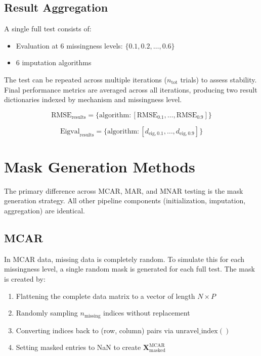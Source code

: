 \documentclass[preprint]{aastex631}
\begin{document}
\subsection{Result Aggregation}

A single full test consists of:
\begin{itemize}
  \item Evaluation at 6 missingness levels: $\{0.1, 0.2, \ldots, 0.6\}$
  \item 6 imputation algorithms
\end{itemize}

The test can be repeated across multiple iterations ($n_{\text{tot}}$ trials) to assess stability. Final performance metrics are averaged across all iterations, producing two result dictionaries indexed by mechanism and missingness level.

\begin{equation}
  \text{RMSE}_{\text{results}} = \{\text{algorithm} : [\text{RMSE}_{0.1}, \ldots, \text{RMSE}_{0.9}]\}
\end{equation}

\begin{equation}
  \text{Eigval}_{\text{results}} = \{\text{algorithm} : [d_{\text{eig},0.1}, \ldots, d_{\text{eig},0.9}]\}
\end{equation}

\section{Mask Generation Methods}
\label{sec:mask-generation}

The primary difference across MCAR, MAR, and MNAR testing is the mask generation strategy. All other pipeline components (initialization, imputation, aggregation) are identical.

\subsection{MCAR}

In MCAR data, missing data is completely random. To simulate this for each missingness level, a single random mask is generated for each full test. The mask is created by:

\begin{enumerate}
  \item Flattening the complete data matrix to a vector of length $N \times P$
  \item Randomly sampling $n_{\text{missing}}$ indices without replacement
  \item Converting indices back to (row, column) pairs via $\text{unravel\_index}()$
  \item Setting masked entries to NaN to create $\mathbf{X}_{\text{masked}}^{\text{MCAR}}$
\end{enumerate}
\end{document}
